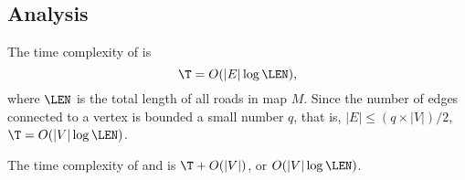 \subsection{Analysis}
The time complexity of  is 
\[\T = O(|E|\log\LEN),\]
where $\LEN$ is the total length of all roads in map $M$.
Since the number of edges connected to a vertex is bounded a small number $q$, 
that is, $|E| \le (q\times|V|)/2$, $\T = O(|V|\log\LEN)$.

The time complexity of  and  
is $\T+O(|V|)$, or $O(|V|\log\LEN)$.

